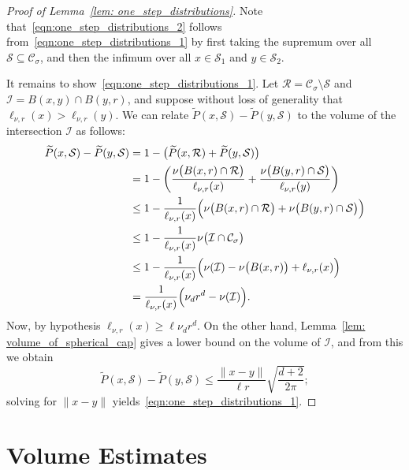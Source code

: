 \documentclass{report}
\newcommand{\1}{\mathbf{1}}
\newcommand{\mc}[1]{\mathcal{#1}}
\newcommand{\wt}[1]{\widetilde{#1}}
\theoremstyle{alden}
\theoremstyle{aldenthm}
\theoremstyle{definition}
\theoremstyle{remark}
\begin{document}
\begin{proof}[Proof of Lemma~\ref{lem: one_step_distributions}]
	Note that~\eqref{eqn:one_step_distributions_2} follows from~\eqref{eqn:one_step_distributions_1} by first taking the supremum over all $\mc{S} \subseteq \mc{C}_{\sigma}$, and then the infimum over all $x \in \mc{S}_1$ and $y \in \mc{S}_2$. 
	
	It remains to show~\eqref{eqn:one_step_distributions_1}. Let $\mc{R} = \mc{C}_{\sigma} \setminus \mc{S}$ and $\mc{I} = B(x,y) \cap B(y,r)$, and suppose without loss of generality that $\ell_{\nu,r}(x) > \ell_{\nu,r}(y)$. We can relate $\wt{P}(x,\mc{S}) - \wt{P}(y,\mc{S})$ to the volume of the intersection $\mc{I}$ as follows:
	\begin{align*}
	\wt{P}(x,\mc{S}) - \wt{P}(y,\mc{S}) & = 1 - \bigl(\wt{P}(x,\mc{R}) + \wt{P}(y,\mc{S})\bigr) \\
	& = 1 - \biggl(\frac{\nu\bigl(B(x,r) \cap \mc{R}\bigr)}{\ell_{\nu,r}(x)} + \frac{\nu\bigl(B(y,r) \cap \mc{S}\bigr)}{\ell_{\nu,r}(y)}\biggr) \\
	& \leq 1 - \frac{1}{\ell_{\nu,r}(x)}\Bigl(\nu\bigl(B(x,r) \cap \mc{R}\bigr) + \nu\bigl(B(y,r) \cap \mc{S}\bigr)\Bigr) \\
	& \leq 1 - \frac{1}{\ell_{\nu,r}(x)}\nu\bigl(\mc{I} \cap \mc{C}_{\sigma}\bigr) \\
	& \leq 1 - \frac{1}{\ell_{\nu,r}(x)}\Bigl(\nu(\mc{I}) - \nu\bigl(B(x,r)\bigr) + \ell_{\nu,r}(x)\Bigr) \\
	& = \frac{1}{\ell_{\nu,r}(x)}\Bigl(\nu_dr^d - \nu(\mc{I})\Bigr).
	\end{align*}
	Now, by hypothesis $\ell_{\nu,r}(x) \geq \ell \nu_dr^d$. On the other hand, Lemma~\ref{lem: volume_of_spherical_cap} gives a lower bound on the volume of $\mc{I}$, and from this we obtain
	\begin{equation*}
	\wt{P}(x,\mc{S}) - \wt{P}(y,\mc{S}) \leq \frac{\|x - y\|}{\ell r} \sqrt{\frac{d + 2}{2\pi}};
	\end{equation*}
	solving for $\|x - y\|$ yields~\eqref{eqn:one_step_distributions_1}.
\end{proof}

\section{Volume Estimates}
\end{document}
